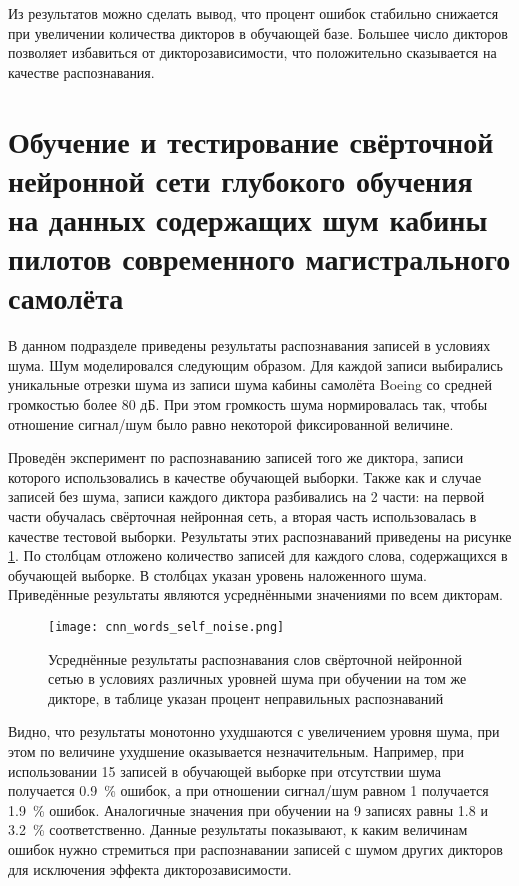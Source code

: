 Из результатов можно сделать вывод, что процент ошибок стабильно снижается при увеличении количества дикторов в обучающей базе.
Большее число дикторов позволяет избавиться от дикторозависимости, что положительно сказывается на качестве распознавания.

\clearpage


\section{Обучение и тестирование свёрточной нейронной сети глубокого обучения на данных содержащих шум кабины пилотов современного магистрального самолёта} \label{sect4_4}

В данном подразделе приведены результаты распознавания записей в условиях шума.
Шум моделировался следующим образом.
Для каждой записи выбирались уникальные отрезки шума из записи шума кабины самолёта Boeing со средней громкостью более 80 дБ.
При этом громкость шума нормировалась так, чтобы отношение сигнал/шум было равно некоторой фиксированной величине.

Проведён эксперимент по распознаванию записей того же диктора, записи которого использовались в качестве обучающей выборки.
Также как и случае записей без шума, записи каждого диктора разбивались на 2 части: на первой части обучалась свёрточная нейронная сеть, а вторая часть использовалась в качестве тестовой выборки.
Результаты этих распознаваний приведены на рисунке \ref{fig:cnn_words_self_noise}.
По столбцам отложено количество записей для каждого слова, содержащихся в обучающей выборке.
В столбцах указан уровень наложенного шума.
Приведённые результаты являются усреднёнными значениями по всем дикторам.

\begin{figure}[h]
	\centering
	\texttt{[image: cnn\_words\_self\_noise.png]}
	\caption{Усреднённые результаты распознавания слов свёрточной нейронной сетью в условиях различных уровней шума при обучении на том же дикторе, в таблице указан процент неправильных распознаваний}
	\label{fig:cnn_words_self_noise}
\end{figure}

Видно, что результаты монотонно ухудшаются с увеличением уровня шума, при этом по величине ухудшение оказывается незначительным.
Например, при использовании 15 записей в обучающей выборке при отсутствии шума получается 0.9~\% ошибок, а при отношении сигнал/шум равном 1 получается 1.9~\% ошибок.
Аналогичные значения при обучении на 9 записях равны 1.8 и 3.2~\% соответственно.
Данные результаты показывают, к каким величинам ошибок нужно стремиться при распознавании записей с шумом других дикторов для исключения эффекта дикторозависимости.

